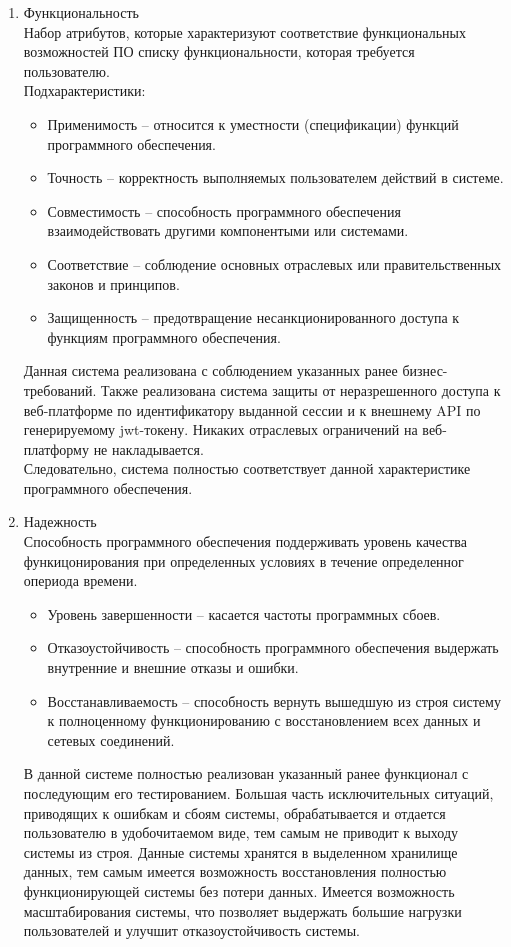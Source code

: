 \documentclass[a4paper,14pt]{extreport} %
\begin{document}
\begin{enumerate}
\item Функциональность \\
Набор атрибутов, которые характеризуют соответствие функциональных возможностей ПО списку функциональности, которая требуется пользователю. \\
Подхарактеристики:
\begin{itemize}
\item Применимость -- относится к уместности (спецификации) функций программного обеспечения.
\item Точность -- корректность выполняемых пользователем действий в системе.
\item Совместимость -- способность программного обеспечения взаимодействовать другими компонентыми или системами.
\item Соответствие -- соблюдение основных отраслевых  или правительственных законов и принципов.
\item Защищенность -- предотвращение несанкционированного доступа к функциям программного обеспечения.
\end{itemize}
Данная система реализована с соблюдением указанных ранее бизнес-требований. Также реализована система защиты от неразрешенного доступа к веб-платформе по идентификатору выданной сессии и к внешнему API по генерируемому jwt-токену. Никаких отраслевых ограничений на веб-платформу не накладывается. \\
Следовательно, система полностью соответствует данной характеристике программного обеспечения.
\item Надежность \\
Способность программного обеспечения поддерживать уровень качества функицонирования при определенных условиях в течение определенног опериода времени.
\begin{itemize}
\item Уровень завершенности -- касается частоты программных сбоев.
\item Отказоустойчивость -- способность программного обеспечения выдержать внутренние и внешние отказы и ошибки.
\item Восстанавливаемость -- способность вернуть вышедшую из строя систему к полноценному функционированию с восстановлением всех данных и сетевых соединений.
\end{itemize}
В данной системе полностью реализован указанный ранее функционал с последующим его тестированием. Большая часть исключительных ситуаций, приводящих к ошибкам и сбоям системы, обрабатывается и отдается пользователю в удобочитаемом виде, тем самым не приводит к выходу системы из строя. Данные системы хранятся в выделенном хранилище данных, тем самым имеется возможность восстановления полностью функционирующей системы без потери данных. Имеется возможность масштабирования системы, что позволяет выдержать большие нагрузки пользователей и улучшит отказоустойчивость системы. \\

\end{enumerate}
\end{document}
